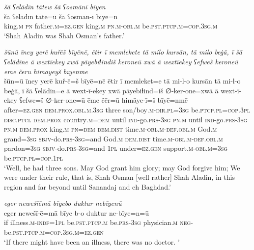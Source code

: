 \ea \label{DG.2}
\textit{šā ʕelādīn tātew šā ʕosmānī bīyen} \\ 
\gll šā ʕelādīn tāte=ū šā ʕosmān-ī bīye=n \\ 
 king\textsc{.m} \textsc{pn} father\textsc{.m}\textsc{=ez}\textsc{.gen} king\textsc{.m} \textsc{pn}\textsc{.m}\textsc{-obl}\textsc{.m} be\textsc{.pst}\textsc{.ptcp}\textsc{.m}\textsc{=cop}\textsc{.3sg}\textsc{.m} \\ 
\glt `Shah Aladin was Shah Osman’s father.'
\z 
 
\ea \label{DG.4}
\textit{šūnū īney yerē kuřēš bīyēnē, ētir ī memlekete tā milo kursān, tā milo beġā, ī šā ʕelādīne ā wextīekey xwā pāyebiɫindiš keroneū xwā ā wextīekey ʕefweš keroneū ēme čērū himāyeyš bīyēnmē} \\ 
\gll šūn=ū īney yerē kuř-ē=š bīyē=nē ētir ī memleket=e tā mi-l-o kursān tā mi-l-o beġā, ī šā ʕelādīn=e ā wext-ī-ekey xwā pāyebiɫind=iš ∅-ker-one=xwā ā wext-ī-ekey ʕefwe=š ∅-ker-one=ū ēme čēr=ū himāye-ī=š bīyē=nmē \\ 
 after\textsc{=ez}\textsc{.gen} \textsc{dem.prox}\textsc{.obl}\textsc{.m}\textsc{.3sg} three son/boy\textsc{.m}\textsc{-dir}\textsc{.pl}\textsc{=3sg} be\textsc{.ptcp}\textsc{.pl}\textsc{=cop}\textsc{.3pl} \textsc{disc.ptcl} \textsc{dem.prox} country\textsc{.m}\textsc{=dem} until \textsc{ind-}go\textsc{.prs}\textsc{-3sg} \textsc{pn}\textsc{.m} until \textsc{ind-}go\textsc{.prs}\textsc{-3sg} \textsc{pn}\textsc{.m} \textsc{dem.prox} king\textsc{.m} \textsc{pn}\textsc{=dem} \textsc{dem.dist} time\textsc{.m}\textsc{-obl}\textsc{.m}\textsc{-def}\textsc{.obl}\textsc{.m} God\textsc{.m} grand\textsc{=3sg} \textsc{sbjv-}do\textsc{.prs}\textsc{-3sg}=and God\textsc{.m} \textsc{dem.dist} time\textsc{.m}\textsc{-obl}\textsc{.m}\textsc{-def}\textsc{.obl}\textsc{.m} pardon\textsc{=3sg} \textsc{sbjv-}do\textsc{.prs}\textsc{-3sg}=and \textsc{1pl} under\textsc{=ez}\textsc{.gen} support\textsc{.m}\textsc{-obl}\textsc{.m}\textsc{=3sg} be\textsc{.ptcp}\textsc{.pl}\textsc{=cop}\textsc{.1pl} \\ 
\glt `Well, he had three sons. May God grant him glory; may God forgive him; We were under their rule, that is, Shah Osman [well rather] Shah Aladin, in this region and far beyond until Sanandaj and eh Baghdad.'
\z 
 
\ea \label{DG.5}
\textit{eger newešīēmā bīyebo duktur nebīyenū} \\ 
\gll eger newešī-ē=mā bīye b-o duktur ne-bīye=n=ū \\ 
 if illness\textsc{.m}\textsc{-indf}\textsc{=1pl} be\textsc{.pst}\textsc{.ptcp}\textsc{.m} be\textsc{.prs}\textsc{-3sg} physician\textsc{.m} \textsc{neg-}be\textsc{.pst}\textsc{.ptcp}\textsc{.m}\textsc{=cop}\textsc{.3sg}\textsc{.m}\textsc{=ez}\textsc{.gen} \\ 
\glt `If there might have been an illness, there was no doctor. '
\z 
 
